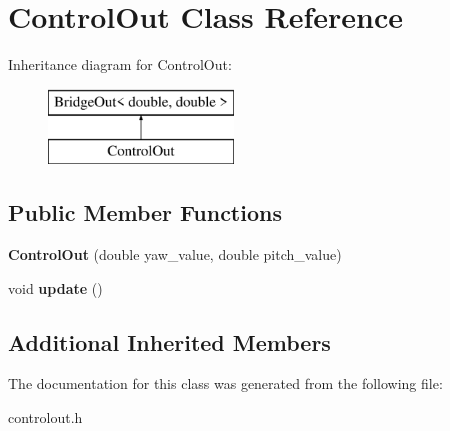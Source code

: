 \hypertarget{classControlOut}{}\section{Control\+Out Class Reference}
\label{classControlOut}
Inheritance diagram for Control\+Out\+:\begin{figure}[H]
\begin{center}
\leavevmode
\includegraphics[height=2.000000cm]{classControlOut}
\end{center}
\end{figure}
\subsection*{Public Member Functions}
\begin{DoxyCompactItemize}
\item 
\mbox{\label{classControlOut_a1736a35a73cb181610c72ced146cc500}} 
{\bfseries Control\+Out} (double yaw\+\_\+value, double pitch\+\_\+value)
\item 
\mbox{\label{classControlOut_ae7753a9f60e8574ed8c8bb5afae28a03}} 
void {\bfseries update} ()
\end{DoxyCompactItemize}
\subsection*{Additional Inherited Members}


The documentation for this class was generated from the following file\+:\begin{DoxyCompactItemize}
\item 
controlout.\+h\end{DoxyCompactItemize}
